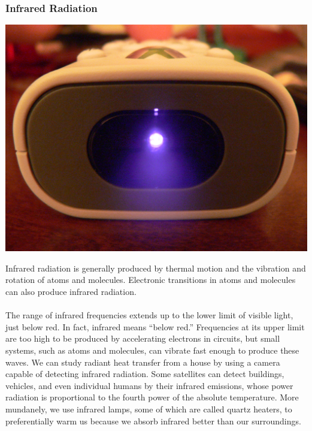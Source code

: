 \documentclass[11pt]{article}
\begin{document}
\subsubsection*{Infrared Radiation}
\begin{center}
	\includegraphics[scale=0.05]{infrared}
\end{center}
Infrared radiation is generally produced by thermal motion and the vibration and rotation of atoms and molecules. Electronic transitions in atoms and molecules can also produce infrared radiation. \\ \\
The range of infrared frequencies extends up to the lower limit of visible light, just below red. In fact, infrared means “below red.” Frequencies at its upper limit are too high to be produced by accelerating electrons in circuits, but small systems, such as atoms and molecules, can vibrate fast enough to produce these waves. We can study radiant heat transfer from a house by using a camera capable of detecting infrared radiation. Some satellites can detect buildings, vehicles, and even individual humans by their infrared emissions, whose power radiation is proportional to the fourth power of the absolute temperature. More mundanely, we use infrared lamps, some of which are called quartz heaters, to preferentially warm us because we absorb infrared better than our surroundings.
\end{document}
